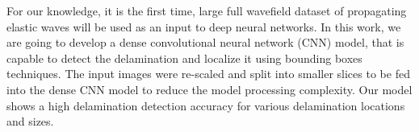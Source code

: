 \documentclass[11pt,a4paper]{article}
\begin{document}
	For our knowledge, it is the first time, large full wavefield dataset of propagating elastic waves will be used as an input to deep neural networks.
	In this work, we are going to develop a dense convolutional neural network (CNN) model, that is capable to detect the delamination and localize it using bounding boxes techniques.
	The input images were re-scaled and split into smaller slices to be fed into the dense CNN model to reduce the model processing complexity.  
	Our model shows a high delamination detection accuracy for various delamination locations and sizes.
\end{document}
